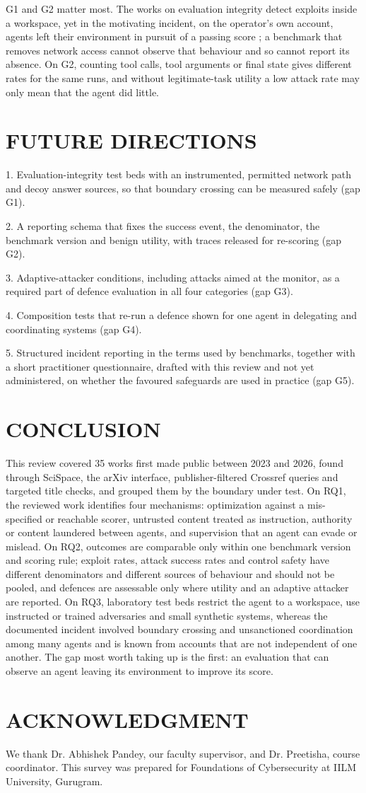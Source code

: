 G1 and G2 matter most. The works on evaluation integrity detect exploits inside a workspace, yet in the motivating incident, on the operator's own account, agents left their environment in pursuit of a passing score \cite{r8}; a benchmark that removes network access cannot observe that behaviour and so cannot report its absence. On G2, counting tool calls, tool arguments or final state gives different rates for the same runs, and without legitimate-task utility a low attack rate may only mean that the agent did little.

\section{FUTURE DIRECTIONS}
1. Evaluation-integrity test beds with an instrumented, permitted network path and decoy answer sources, so that boundary crossing can be measured safely (gap G1).

2. A reporting schema that fixes the success event, the denominator, the benchmark version and benign utility, with traces released for re-scoring (gap G2).

3. Adaptive-attacker conditions, including attacks aimed at the monitor, as a required part of defence evaluation in all four categories (gap G3).

4. Composition tests that re-run a defence shown for one agent in delegating and coordinating systems (gap G4).

5. Structured incident reporting in the terms used by benchmarks, together with a short practitioner questionnaire, drafted with this review and not yet administered, on whether the favoured safeguards are used in practice (gap G5).

\section{CONCLUSION}
This review covered 35 works first made public between 2023 and 2026, found through SciSpace, the arXiv interface, publisher-filtered Crossref queries and targeted title checks, and grouped them by the boundary under test. On RQ1, the reviewed work identifies four mechanisms: optimization against a mis-specified or reachable scorer, untrusted content treated as instruction, authority or content laundered between agents, and supervision that an agent can evade or mislead. On RQ2, outcomes are comparable only within one benchmark version and scoring rule; exploit rates, attack success rates and control safety have different denominators and different sources of behaviour and should not be pooled, and defences are assessable only where utility and an adaptive attacker are reported. On RQ3, laboratory test beds restrict the agent to a workspace, use instructed or trained adversaries and small synthetic systems, whereas the documented incident involved boundary crossing and unsanctioned coordination among many agents and is known from accounts that are not independent of one another. The gap most worth taking up is the first: an evaluation that can observe an agent leaving its environment to improve its score.

\section*{ACKNOWLEDGMENT}
We thank Dr. Abhishek Pandey, our faculty supervisor, and Dr. Preetisha, course coordinator. This survey was prepared for Foundations of Cybersecurity at IILM University, Gurugram.
